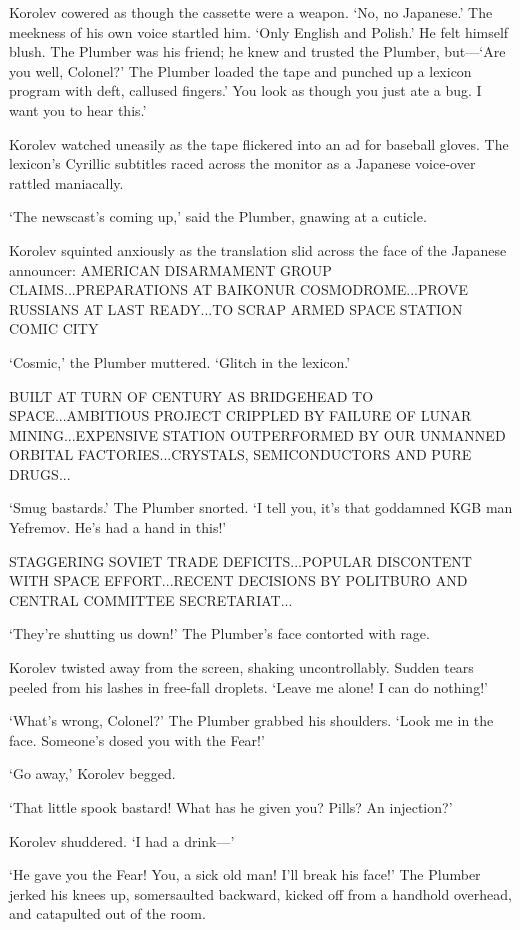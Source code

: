 Korolev cowered as though the cassette were a weapon. `No, no Japanese.' The meekness of his own voice startled him. `Only English and Polish.' He felt himself blush. The Plumber was his friend; he knew and trusted the Plumber, but---`Are you well, Colonel?' The Plumber loaded the tape and punched up a lexicon program with deft, callused fingers.' You look as though you just ate a bug. I want you to hear this.'

Korolev watched uneasily as the tape flickered into an ad for baseball gloves. The lexicon's Cyrillic subtitles raced across the monitor as a Japanese voice-over rattled maniacally.

`The newscast's coming up,' said the Plumber, gnawing at a cuticle.

Korolev squinted anxiously as the translation slid across the face of the Japanese announcer: AMERICAN DISARMAMENT GROUP CLAIMS...PREPARATIONS AT BAIKONUR COSMODROME...PROVE RUSSIANS AT LAST READY...TO SCRAP ARMED SPACE STATION COMIC CITY

`Cosmic,' the Plumber muttered. `Glitch in the lexicon.'

BUILT AT TURN OF CENTURY AS BRIDGEHEAD TO SPACE...AMBITIOUS PROJECT CRIPPLED BY FAILURE OF LUNAR MINING...EXPENSIVE STATION OUTPERFORMED BY OUR UNMANNED ORBITAL FACTORIES...CRYSTALS, SEMICONDUCTORS AND PURE DRUGS...

`Smug bastards.' The Plumber snorted. `I tell you, it's that goddamned KGB man Yefremov. He's had a hand in this!'

STAGGERING SOVIET TRADE DEFICITS...POPULAR DISCONTENT WITH SPACE EFFORT...RECENT DECISIONS BY POLITBURO AND CENTRAL COMMITTEE SECRETARIAT...

`They're shutting us down!' The Plumber's face contorted with rage.

Korolev twisted away from the screen, shaking uncontrollably. Sudden tears peeled from his lashes in free-fall droplets. `Leave me alone! I can do nothing!'

`What's wrong, Colonel?' The Plumber grabbed his shoulders. `Look me in the face. Someone's dosed you with the Fear!'

`Go away,' Korolev begged.

`That little spook bastard! What has he given you? Pills? An injection?'

Korolev shuddered. `I had a drink---'

`He gave you the Fear! You, a sick old man! I'll break his face!' The Plumber jerked his knees up, somersaulted backward, kicked off from a handhold overhead, and catapulted out of the room.

